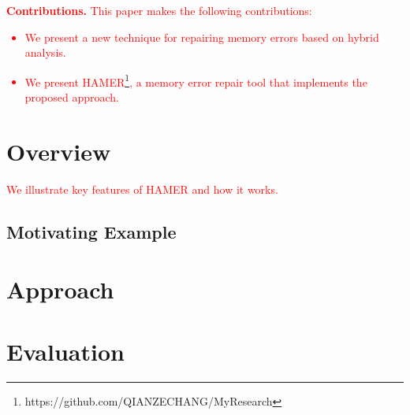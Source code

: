 \documentclass[twoside,twocolumn]{article}
\begin{document}
\textcolor{red}{
\textbf{Contributions.} This paper makes the following contributions:
\begin{itemize}
  \item We present a new technique for repairing memory errors based on hybrid analysis.
  \item We present HAMER\footnote{https://github.com/QIANZECHANG/MyResearch}, a memory error repair tool that implements the proposed approach.
\end{itemize}
}

\section{Overview}
\textcolor{red}{
We illustrate key features of HAMER and how it works.
}
\subsection{Motivating Example}

\begin{minipage}{\linewidth}

\end{minipage}


\section{Approach}





\section{Evaluation}
\end{document}
